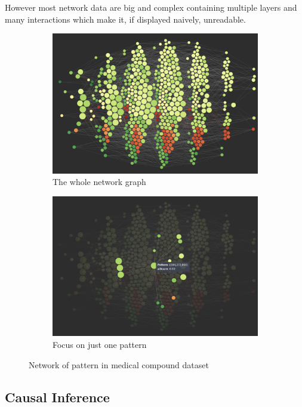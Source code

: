 However most network data are big and complex containing multiple layers and many interactions which make it, if displayed naively, unreadable. 

\begin{figure}[H]
\begin{subfigure}{.45\textwidth}
  \centering
  \captionsetup{justification=centering}
  \includegraphics[width=.8\linewidth]{./pics/network21.png}  
  \caption{The whole network graph}
  \label{fig:sub-first-network}
\end{subfigure}
\begin{subfigure}{.45\textwidth}
  \centering
  \captionsetup{justification=centering}
  \includegraphics[width=0.8\linewidth]{./pics/network22.png}  
  \caption{Focus on just one pattern}
  \label{fig:sub-second-focus-network}
\end{subfigure}
\captionsetup{justification=centering}
\caption{Network of pattern in medical compound dataset \cite{networkgraph}}
\label{fig:network-graph}
\end{figure}

\subsection{Causal Inference}


